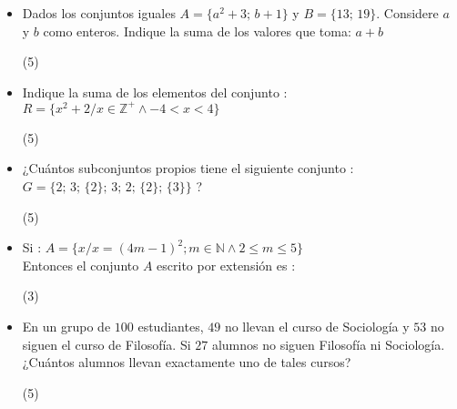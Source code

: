 \documentclass[10pt, twocolumn, landscape, a4paper]{article}
\begin{document}
\begin{itemize}
{Indique el número de proposiciones verdaderas :
\begin{tasks}(5)
\end{tasks}}
\item{Dados los conjuntos iguales $A = \{ a^2 + 3;\,b + 1\}$ y $B = \{13;\,19\}$. Considere $a$ y $b$ como enteros. Indique la suma de los valores que toma: $a + b$
\begin{tasks}(5)
\end{tasks}}
\item{Indique la suma de los elementos del conjunto : \\ $R = \{x^2 + 2 / x \in \mathbb{Z}^+ \wedge -4 < x < 4\}$
\begin{tasks}(5)
\end{tasks}}
\item{¿Cuántos subconjuntos propios tiene el siguiente conjunto
: \\ $G = \{2;\,3;\,\{2\};\,3;\,2;\,\{2\};\,\{3\}\}$ ?
\begin{tasks}(5)
\end{tasks}}
\item{Si : $A = \{x/x = (4m -1)^2; m \in \mathbb{N} \wedge 2 \leq m \leq 5\}$ \\ Entonces el conjunto $A$ escrito por extensión es :
\begin{tasks}(3)
\end{tasks}}
\item{En un grupo de $100$ estudiantes, $49$ no llevan el curso de Sociología y $53$ no siguen el curso de Filosofía. Si $27$ alumnos no siguen Filosofía ni Sociología. ¿Cuántos alumnos llevan exactamente uno de tales cursos?
\begin{tasks}(5)
\end{tasks}}
\end{itemize}
\end{document}
